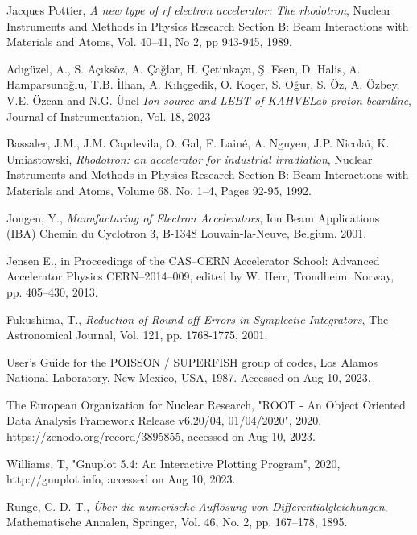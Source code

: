 \documentclass[a4paper,oneside,12pt]{report}
\numberwithin{equation}{chapter}
\begin{document}
\begin{thebibliography}{9}

    Jacques Pottier,
    \emph{A new type of rf electron accelerator: The rhodotron},
    Nuclear Instruments and Methods in Physics Research Section B: Beam Interactions with Materials and Atoms,
    Vol. 40–41,
    No 2,
    pp 943-945,
    1989.

    Adıgüzel, A., S. Açıksöz, A. Çağlar, H. Çetinkaya, Ş. Esen, D. Halis, A. Hamparsunoğlu, T.B. İlhan, A. Kılıçgedik, O. Koçer, S. Oğur, S. Öz, A. Özbey, V.E. Özcan and N.G. Ünel
    \emph{Ion source and LEBT of KAHVELab proton beamline},
    Journal of Instrumentation,
    Vol. 18,
    2023

    Bassaler, J.M., J.M. Capdevila, O. Gal, F. Lainé, A. Nguyen, J.P. Nicolaï, K. Umiastowski,
    \emph{Rhodotron: an accelerator for industrial irradiation},
    Nuclear Instruments and Methods in Physics Research Section B: Beam Interactions with Materials and Atoms,
    Volume 68, No. 1–4,
    Pages 92-95,
    1992.

    Jongen, Y.,
    \emph{Manufacturing of Electron Accelerators},
    Ion Beam Applications (IBA) Chemin du Cyclotron 3,
    B-1348 Louvain-la-Neuve, Belgium.
    2001.

    Jensen E., in Proceedings of the CAS–CERN Accelerator School: Advanced Accelerator Physics CERN–2014–009,
    edited by W. Herr, Trondheim, Norway,
    pp. 405–430,
    2013.

    Fukushima, T., 
    \emph{Reduction of Round-off Errors in Symplectic Integrators},
    The Astronomical Journal,
    Vol. 121,
    pp. 1768-1775,
    2001.

    User's Guide for the POISSON / SUPERFISH group of codes, 
    Los Alamos National Laboratory, New Mexico, USA, 1987. Accessed on Aug 10, 2023. 
    
    The European Organization for Nuclear Research, 
    "ROOT - An Object Oriented Data Analysis Framework Release v6.20/04, 01/04/2020", 2020,
    https://zenodo.org/record/3895855, accessed on Aug 10, 2023.

    Williams, T, "Gnuplot 5.4: An Interactive
    Plotting Program", 2020, http://gnuplot.info, accessed on Aug 10, 2023.

    Runge, C. D. T.,
    \emph{Über die numerische Auflösung von Differentialgleichungen}, 
    Mathematische Annalen, 
    Springer, 
    Vol. 46,
    No. 2,
    pp. 167–178,
    1895.


\end{thebibliography}
\end{document}
